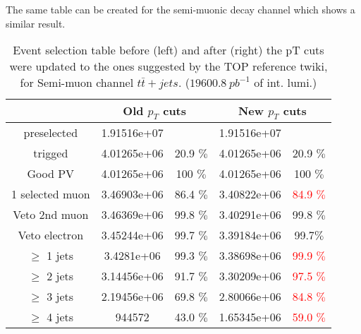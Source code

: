 \documentclass[a4paper,12pt]{report}
\begin{document}
\newpage
The same table can be created for the semi-muonic decay channel which shows a similar result.\\
\begin{table}
\caption{Event selection table before (left) and after (right) the pT cuts were updated to the ones suggested by the TOP reference twiki, for Semi-muon channel $t\bar{t}+jets$. ($19600.8~pb^{-1}$ of int. lumi.)}
\centering
\begin{tabular}{|c|c|c|c|c|}
\hline
				& \multicolumn{2}{|c|}{Old $p_T$ cuts}	& \multicolumn{2}{|c|}{New $p_T$ cuts}	\\
\hline
preselected			& 1.91516e+07	& 		 	& 1.91516e+07	&	 		\\

trigged				& 4.01265e+06	&	20.9 $\%$	& 4.01265e+06	&	20.9 $\%$	\\

Good PV				& 4.01265e+06	&	 100 $\%$	& 4.01265e+06	&	100 $\%$	\\

1 selected muon			& 3.46903e+06	&	 86.4 $\%$	& 3.40822e+06	&	\textcolor{red}{84.9 $\%$}	\\

Veto 2nd muon			& 3.46369e+06	&	 99.8 $\%$	& 3.40291e+06	&	99.8 $\%$	\\

Veto electron			& 3.45244e+06	&	 99.7 $\%$	& 3.39184e+06	&	99.7$\%$	\\

$\geq$ 1 jets			& 3.4281e+06	&	 99.3 $\%$	& 3.38698e+06	&	\textcolor{red}{99.9 $\%$}	\\

$\geq$ 2 jets			& 3.14456e+06	&	 91.7 $\%$	& 3.30209e+06	&	\textcolor{red}{97.5 $\%$}	\\

$\geq$ 3 jets			& 2.19456e+06	&	 69.8 $\%$	& 2.80066e+06	&	\textcolor{red}{84.8 $\%$}	\\

$\geq$ 4 jets			& 944572	&	 43.0 $\%$	& 1.65345e+06	&	\textcolor{red}{59.0 $\%$}	\\
\hline
\end{tabular}
\end{table}

\newpage
\end{document}
